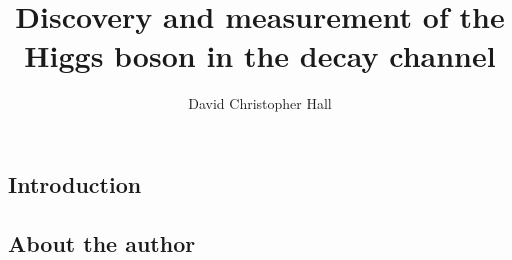 \documentclass[hyper,allcolors=blue]{mythesis}  %
\title{Discovery and measurement of the Higgs boson in the \WW decay channel}
\author{David Christopher Hall}
\begin{document}
\begin{frontmatter}
  
\end{frontmatter}

\begin{mainmatter}
  \clearpage
  
  \chapter*{Introduction}
    \label{chap:intro}
    

  
  
  
  
  
  
  
  
  
  
\end{mainmatter}

\begin{onehalfspacing}
  \cleardoublepage
  \section*{About the author}
  \thispagestyle{plain}
  
\end{onehalfspacing}
\end{document}
